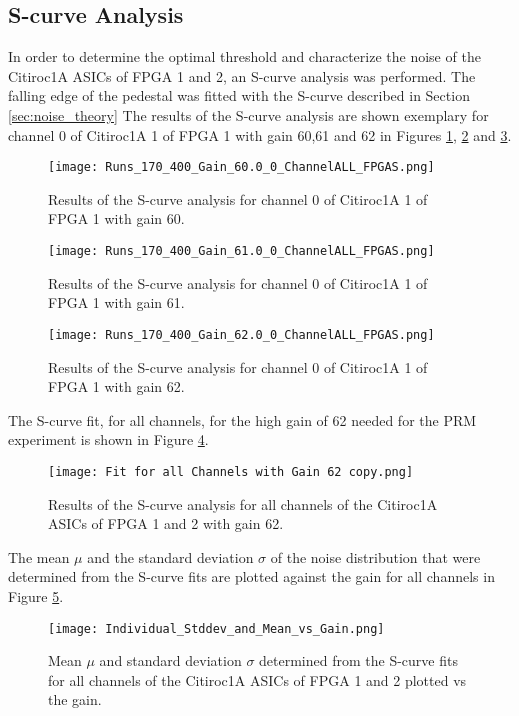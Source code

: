 \subsection{S-curve Analysis}
In order to determine the optimal threshold and characterize the noise of the Citiroc1A ASICs of FPGA 1 and 2, an S-curve analysis was performed.
\newline
The falling edge of the pedestal was fitted with the S-curve described in Section \ref{sec:noise_theory}
\newline
The results of the S-curve analysis are shown exemplary for channel 0 of Citiroc1A 1 of FPGA 1 with gain 60,61 and 62 in Figures \ref{fig:S_curve_60}, \ref{fig:S_curve_61} and \ref{fig:S_curve_62}.

\begin{figure}[H]
    \centering
    \texttt{[image: Runs\_170\_400\_Gain\_60.0\_0\_ChannelALL\_FPGAS.png]}
    \caption{Results of the S-curve analysis for channel 0 of Citiroc1A 1 of FPGA 1 with gain 60.}
    \label{fig:S_curve_60}
\end{figure}
\begin{figure}[H]
    \centering
    \texttt{[image: Runs\_170\_400\_Gain\_61.0\_0\_ChannelALL\_FPGAS.png]}
    \caption{Results of the S-curve analysis for channel 0 of Citiroc1A 1 of FPGA 1 with gain 61.}
    \label{fig:S_curve_61}
\end{figure}
\begin{figure}[H]
    \centering
    \texttt{[image: Runs\_170\_400\_Gain\_62.0\_0\_ChannelALL\_FPGAS.png]}
    \caption{Results of the S-curve analysis for channel 0 of Citiroc1A 1 of FPGA 1 with gain 62.}
    \label{fig:S_curve_62}
\end{figure}
The S-curve fit, for all channels, for the high gain of 62 needed for the PRM experiment is shown in Figure \ref{fig:S_curve_62_ALL}. 

\begin{figure}[H]
    \centering
    \texttt{[image: Fit for all Channels with Gain 62 copy.png]}
    \caption{Results of the S-curve analysis for all channels of the Citiroc1A ASICs of FPGA 1 and 2 with gain 62.}
    \label{fig:S_curve_62_ALL}
\end{figure}
The mean $\mu$ and the standard deviation $\sigma$ of the noise distribution that were determined from the S-curve fits %
are plotted against the gain for all channels in Figure \ref{fig:Mean vs gain}.
\begin{figure}[H]
    \centering
    \texttt{[image: Individual\_Stddev\_and\_Mean\_vs\_Gain.png]}
    \caption{Mean $\mu$ and standard deviation $\sigma$ determined from the S-curve fits for all channels of the Citiroc1A ASICs of FPGA 1 and 2 plotted vs the gain.}
    \label{fig:Mean vs gain}
\end{figure}

